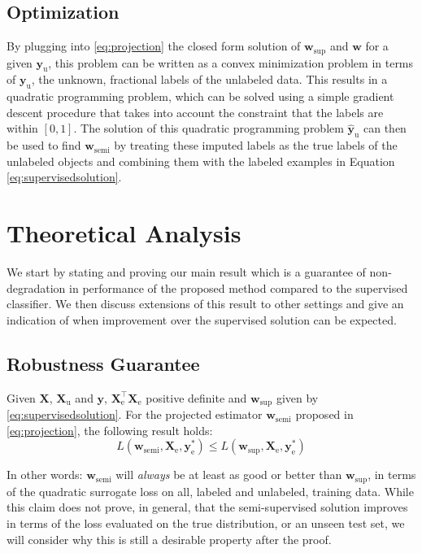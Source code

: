 \documentclass[smallcondensed]{svjour3}\usepackage[]{graphicx}\usepackage[]{color}
\newcommand{\Xe}{\vec{X}_\mathrm{e}  }
\renewcommand{\vec}[1]{\mathbf{#1}}
\begin{document}
\subsection{Optimization}
By plugging into \eqref{eq:projection} the closed form solution of $\vec{w}_\text{sup}$ and $\vec{w}$  for a given $\vec{y}_\text{u}$, this problem can be written as a convex minimization problem in terms of $\vec{y}_\text{u}$, the unknown, fractional labels of the unlabeled data. This results in a quadratic programming problem, which can be solved using a simple gradient descent procedure that takes into account the constraint that the labels are within $[0,1]$. The solution of this quadratic programming problem $\vec{\hat{y}}_\text{u}$ can then be used to find  $\vec{w}_\text{semi}$ by treating these imputed labels as the true labels of the unlabeled objects and combining them with the labeled examples in Equation \eqref{eq:supervisedsolution}.

\section{Theoretical Analysis}
\label{section:theory}

We start by stating and proving our main result which is a guarantee of non-degradation in performance of the proposed method compared to the supervised classifier. We then discuss extensions of this result to other settings and give an indication of when improvement over the supervised solution can be expected.

\subsection{Robustness Guarantee}
\begin{theorem}
\label{th:robustness}
Given $\vec{X}$, $\vec{X}_\mathrm{u}$ and $\vec{y}$, $\Xe^\top \Xe$ positive definite and $\vec{w}_\mathrm{sup}$ given by \eqref{eq:supervisedsolution}. For the projected estimator $\vec{w}_\mathrm{semi}$ proposed in \eqref{eq:projection}, the following result holds:
$$L(\vec{w}_\mathrm{semi},\Xe,\vec{y}_\mathrm{e}^{\ast}) \leq L(\vec{w}_\mathrm{sup},\Xe,\vec{y}_\mathrm{e}^{\ast}) $$
\end{theorem}
In other words: $\vec{w}_\text{semi}$ will \emph{always} be at least as good or better than $\vec{w}_\text{sup}$, in terms of the quadratic surrogate loss on all, labeled and unlabeled, training data. While this claim does not prove, in general, that the semi-supervised solution improves in terms of the loss evaluated on the true distribution, or an unseen test set, we will consider why this is still a desirable property after the proof.
\end{document}
